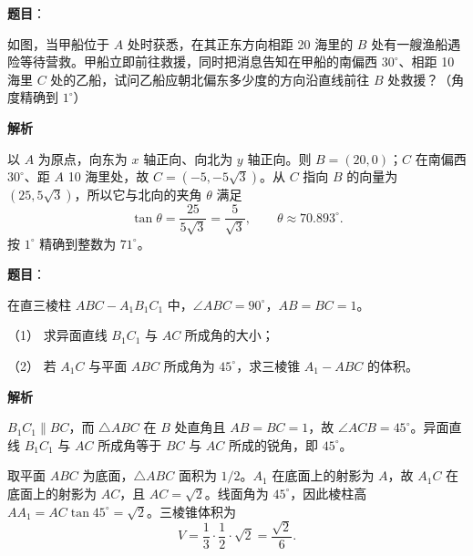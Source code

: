 \begin{answer}

\textbf{题目}：

如图，当甲船位于 $A$ 处时获悉，在其正东方向相距 20 海里的 $B$ 处有一艘渔船遇险等待营救。甲船立即前往救援，同时把消息告知在甲船的南偏西 $30^\circ$、相距 10 海里 $C$ 处的乙船，试问乙船应朝北偏东多少度的方向沿直线前往 $B$ 处救援？（角度精确到 $1^\circ$）
\nopagebreak[4]
\begin{center}\end{center}
\nopagebreak[4]
\textbf{解析}

以 $A$ 为原点，向东为 $x$ 轴正向、向北为 $y$ 轴正向。则 $B=(20,0)$；$C$ 在南偏西 $30^\circ$、距 $A$ 10 海里处，故 $C=(-5,-5\sqrt3)$。从 $C$ 指向 $B$ 的向量为 $(25,5\sqrt3)$，所以它与北向的夹角 $\theta$ 满足
\nopagebreak[4]
\[
\tan\theta=\frac{25}{5\sqrt3}=\frac5{\sqrt3},\qquad
\theta\approx70.893^\circ.
\]
按 $1^\circ$ 精确到整数为 $71^\circ$。


\end{answer}
\begin{answer}

\textbf{题目}：

在直三棱柱 $ABC-A_1B_1C_1$ 中，$\angle ABC=90^\circ$，$AB=BC=1$。

（1） 求异面直线 $B_1C_1$ 与 $AC$ 所成角的大小；

（2） 若 $A_1C$ 与平面 $ABC$ 所成角为 $45^\circ$，求三棱锥 $A_1-ABC$ 的体积。
\nopagebreak[4]
\begin{center}\end{center}
\nopagebreak[4]
\textbf{解析}


$B_1C_1\parallel BC$，而 $\triangle ABC$ 在 $B$ 处直角且 $AB=BC=1$，故 $\angle ACB=45^\circ$。异面直线 $B_1C_1$ 与 $AC$ 所成角等于 $BC$ 与 $AC$ 所成的锐角，即 $45^\circ$。


取平面 $ABC$ 为底面，$\triangle ABC$ 面积为 $1/2$。$A_1$ 在底面上的射影为 $A$，故 $A_1C$ 在底面上的射影为 $AC$，且 $AC=\sqrt2$。线面角为 $45^\circ$，因此棱柱高 $AA_1=AC\tan45^\circ=\sqrt2$。三棱锥体积为
\nopagebreak[4]
\[
V=\frac13\cdot\frac12\cdot\sqrt2=\frac{\sqrt2}{6}.
\]



\end{answer}
